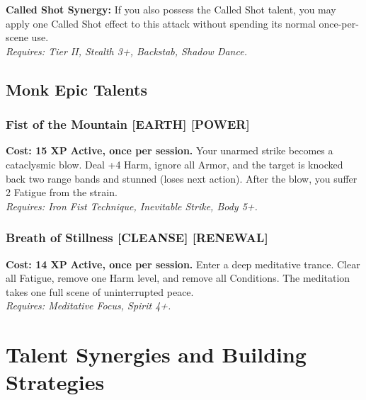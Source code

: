 {{\textbf{Called Shot Synergy:} If you also possess the Called Shot talent, you may apply one Called Shot effect to this attack without spending its normal once-per-scene use. \\
\textit{Requires: Tier II, Stealth 3+, Backstab, Shadow Dance.}

\subsection*{Monk Epic Talents}
\label{sec:epic-monk}

\subsubsection*{Fist of the Mountain \textnormal{[EARTH] [POWER]}}
\label{talent:fist-of-the-mountain}
\textbf{Cost: 15 XP} \textbf{Active, once per session.} Your unarmed strike becomes a cataclysmic blow. Deal +4 Harm, ignore all Armor, and the target is knocked back two range bands and stunned (loses next action). After the blow, you suffer 2 Fatigue from the strain. \\
\textit{Requires: Iron Fist Technique, Inevitable Strike, Body 5+.}

\subsubsection*{Breath of Stillness \textnormal{[CLEANSE] [RENEWAL]}}
\label{talent:breath-of-stillness}
\textbf{Cost: 14 XP} \textbf{Active, once per session.} Enter a deep meditative trance. Clear all Fatigue, remove one Harm level, and remove all Conditions. The meditation takes one full scene of uninterrupted peace. \\
\textit{Requires: Meditative Focus, Spirit 4+.}

\section{Talent Synergies and Building Strategies}
\label{sec:talent-synergies}

}}
